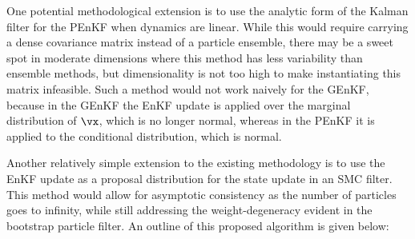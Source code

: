 \documentclass[12pt]{article}
\begin{document}

One potential methodological extension is to use the analytic form of the
Kalman filter for the PEnKF when dynamics are linear. While this would require
carrying a dense covariance matrix instead of a particle ensemble, there may
be a sweet spot in moderate dimensions where this method has less variability
than ensemble methods, but dimensionality is not too high to make instantiating
this matrix infeasible. Such a method would not work naively for the GEnKF,
because in the GEnKF the EnKF update is applied over the marginal distribution
of $\vx$, which is no longer normal, whereas in the PEnKF it is applied to the
conditional distribution, which is normal.

Another relatively simple extension to the existing methodology is to use
the EnKF update as a proposal distribution for the state update in an SMC filter.
This method would allow for asymptotic consistency as the number of particles
goes to infinity, while still addressing the weight-degeneracy evident in the
bootstrap particle filter. An outline of this proposed algorithm is given below:
\end{document}
